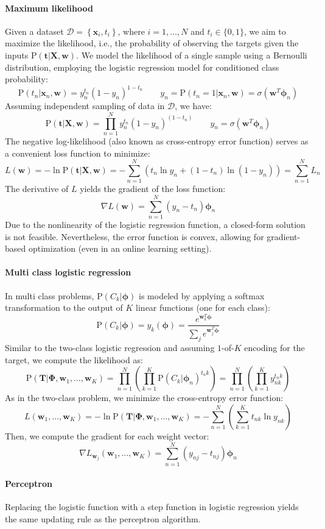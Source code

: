 \paragraph*{Maximum likelihood}
Given a dataset $\mathcal{D}=\left\{ \textbf{x}_i,t_i \right\}$, where $i=1,\dots,N$ and $t_i \in \{0,1\}$, we aim to maximize the likelihood, i.e., the probability of observing the targets given the inputs $\text{P}(\textbf{t}|\textbf{X},\textbf{w})$. 
We model the likelihood of a single sample using a Bernoulli distribution, employing the logistic regression model for conditioned class probability:
\[\text{P}(t_n|\textbf{x}_n,\textbf{w})=y_n^{t_n}\left( 1-y_n \right)^{1-t_n} \qquad y_n=\text{P}(t_n=1|\textbf{x}_n,\textbf{w})=\sigma(\textbf{w}^T\boldsymbol{\phi}_n)\]
Assuming independent sampling of data in $\mathcal{D}$, we have:
\[\text{P}(\textbf{t}|\textbf{X},\textbf{w})=\prod_{n=1}^N y_n^{t_n}\left( 1-y_n \right)^{(1-t_n)} \qquad y_n=\sigma(\textbf{w}^T\boldsymbol{\phi}_n)\]
The negative log-likelihood (also known as cross-entropy error function) serves as a convenient loss function to minimize:
\[L(\textbf{w})=-\ln \text{P}(\textbf{t}|\textbf{X},\textbf{w})=-\sum_{n=1}^N \left( t_n\ln y_n +(1-t_n) \ln (1-y_n) \right) = \sum_{n=1}^NL_n\]
The derivative of $L$ yields the gradient of the loss function:
\[\nabla L(\textbf{w})=\sum_{n=1}^N\left( y_n-t_n \right) \boldsymbol{\phi}_n\]
Due to the nonlinearity of the logistic regression function, a closed-form solution is not feasible. 
Nevertheless, the error function is convex, allowing for gradient-based optimization (even in an online learning setting).

\paragraph*{Multi class logistic regression}
In multi class problems, $\text{P}(C_k|\boldsymbol{\phi})$ is modeled by applying a softmax transformation to the output of $K$ linear functions (one for each class):
\[\text{P}(C_k|\boldsymbol{\phi})=y_k(\boldsymbol{\phi})=\dfrac{e^{\textbf{w}_k^T\boldsymbol{\phi}}}{\sum_j e^{\textbf{w}_j^T\boldsymbol{\phi}}}\]
Similar to the two-class logistic regression and assuming $1$-of-$K$  encoding for the target, we compute the likelihood as:
\[\text{P}(\textbf{T}|\boldsymbol{\Phi},\textbf{w}_1,\dots,\textbf{w}_K)=\prod_{n=1}^N \left( \prod_{k=1}^K \text{P}(C_k|\boldsymbol{\phi}_n)^{t_nk} \right)=\prod_{n=1}^N \left( \prod_{k=1}^K y^{t_nk}_{nk} \right)\]
As in the two-class problem, we minimize the cross-entropy error function:
\[L(\textbf{w}_1,\dots,\textbf{w}_K)=-\ln \text{P}(\textbf{T}|\boldsymbol{\Phi},\textbf{w}_1,\dots,\textbf{w}_K)=-\sum_{n=1}^N \left(\sum_{k=1}^K t_{nk}\ln y_{nk} \right)\]
Then, we compute the gradient for each weight vector:
\[\nabla L_{\textbf{w}_j}(\textbf{w}_1,\dots,\textbf{w}_K)=\sum_{n=1}^N\left( y_{nj}-t_{nj} \right) \boldsymbol{\phi}_n\]

\paragraph*{Perceptron}
Replacing the logistic function with a step function in logistic regression yields the same updating rule as the perceptron algorithm.
